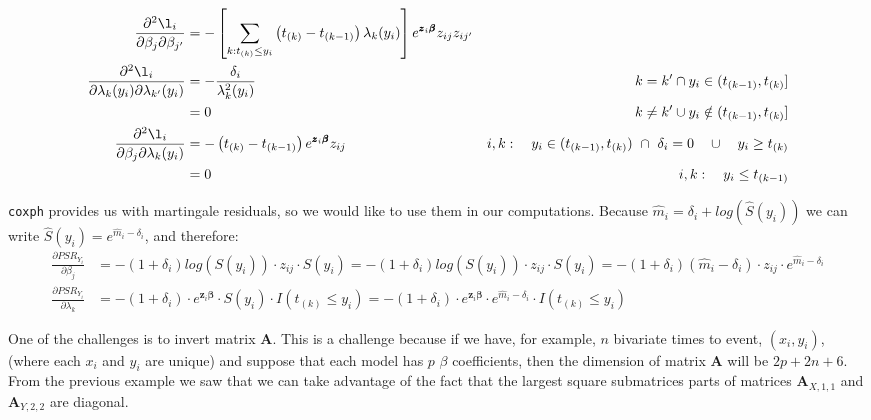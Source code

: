 \documentclass[]{article}
\begin{document}
$$
  \begin{aligned}
   \frac{\partial^2 \l_i}{\partial \beta_j \partial \beta_{j'}}  &= -\left[  \sum_{k: t_{(k)}\leq y_i} \left(t_{(k)} - t_{(k-1)}\right) \lambda_k(y_i)   \right]  e^{\pmb{z}_i\pmb{\beta}} z_{ij} z_{ij'}\\
    \frac{\partial^2 \l_i}{\partial \lambda_k(y_i)\partial \lambda_{k'}(y_i)}  &= -\frac{\delta_i}{\lambda_k^2(y_i)} ~~~~  &k=k' \cap y_i \in (t_{(k - 1)}, t_{(k)}]\\
      &= 0~~~~  &k \neq k' \cup   y_i \notin (t_{(k - 1)}, t_{(k)}] \\
   \frac{\partial^2 \l_i}{\partial \beta_j \partial \lambda_k(y_i)}  &= -\left(  t_{(k)} - t_{(k-1)}  \right) e^{\pmb{z}_i\pmb{\beta}} z_{ij}~~~~  &i,k:~~~y_i \in (t_{(k - 1)}, t_{(k)}) ~\cap~ \delta_i = 0 ~~~ \cup ~~~ y_i \geq t_{(k)}\\
      &= 0 ~~~~  &i,k:~~~y_i \leq t_{(k-1)}\\
  \end{aligned}
$$


\texttt{coxph} provides us with martingale residuals, so we would like to use them in our computations. Because $\hat{m}_i = \delta_i + log\left(\hat{S}(y_i) \right)$ we can write $\hat{S}(y_i) = e^{\hat{m}_i - \delta_i} $, and therefore: 
  $$
  \begin{aligned}
    \frac{\partial PSR_{Y_i}}{\partial \beta_j} & = -(1+\delta_i)log\left(S(y_i)\right) \cdot  z_{ij}  \cdot  S(y_i)=  -(1+\delta_i)log\left(S(y_i)\right) \cdot  z_{ij}  \cdot  S(y_i)=  -(1+\delta_i)\left(\hat{m}_i - \delta_i \right) \cdot  z_{ij}  \cdot  e^{\hat{m}_i - \delta_i}\\
    \frac{\partial PSR_{Y_i}}{\partial \lambda_k} & = -(1+\delta_i)\cdot  e^{\pmb{z}_i\pmb{\beta}}   \cdot  S(y_i) \cdot I(t_{(k)}\leq y_i)= - (1+\delta_i)\cdot  e^{\pmb{z}_i\pmb{\beta}}   \cdot  e^{\hat{m}_i - \delta_i}\cdot I(t_{(k)}\leq y_i)
  \end{aligned}
  $$
  
One of the challenges is to invert matrix $\pmb{A}$. This is a challenge because if we have, for example, $n$ bivariate times to event, $(x_i,y_i)$, (where each $x_i$ and $y_i$ are unique) and suppose that each model has $p$ $\beta$ coefficients, then the dimension of matrix $\pmb{A}$ will be $2p + 2n + 6$. From the previous example we saw that we can take advantage of the fact that the  largest square submatrices parts of matrices $\pmb{A}_{X,1,1}$ and $\pmb{A}_{Y,2,2}$ are diagonal.
\end{document}
